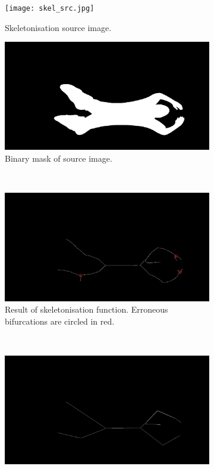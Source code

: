 \documentclass[a4paper, 12pt]{article}
\begin{document}
\begin{figure}[H]
	\centering
	\begin{subfigure}{.5\textwidth}
  		\centering
  		\texttt{[image: skel\_src.jpg]}
  		\caption{Skeletonisation source image.}
  		\label{fig:skel_src}
	\end{subfigure}%
	\begin{subfigure}{.5\textwidth}
  		\centering
  		\includegraphics[width=.95\linewidth]{skel_src_mask.jpg}
  		\caption{Binary mask of source image.}
  		\label{fig:skel_src_mask}
	\end{subfigure}\\
	\begin{subfigure}{\textwidth}
  		\centering
  		\includegraphics[width=\linewidth]{skel.jpg}
  		\caption{Result of skeletonisation function. Erroneous bifurcations are circled in red.}
  		\label{fig:skel}
	\end{subfigure}\\
	\begin{subfigure}{\textwidth}
  		\centering
  		\includegraphics[width=\linewidth]{skel_reduced.jpg}

\end{subfigure}
\end{figure}
\end{document}
